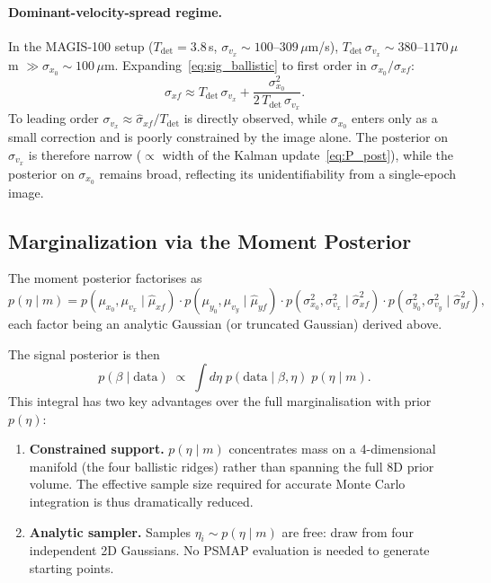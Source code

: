 \documentclass[11pt,a4paper]{article}
\begin{document}
\paragraph{Dominant-velocity-spread regime.}
In the MAGIS-100 setup ($T_\mathrm{det}=3.8$\,s, $\sigma_{v_x}\sim 100$--$309\,\mu$m/s),
$T_\mathrm{det}\,\sigma_{v_x} \sim 380$--$1170\,\mu$m $\gg \sigma_{x_0}\sim 100\,\mu$m.
Expanding~\eqref{eq:sig_ballistic} to first order in $\sigma_{x_0}/\sigma_{xf}$:
\begin{equation}
  \sigma_{xf} \approx T_\mathrm{det}\,\sigma_{v_x}
  + \frac{\sigma^2_{x_0}}{2\,T_\mathrm{det}\,\sigma_{v_x}}.
  \label{eq:sig_expand}
\end{equation}
To leading order $\sigma_{v_x} \approx \hat\sigma_{xf}/T_\mathrm{det}$ is
directly observed, while $\sigma_{x_0}$ enters only as a small correction and
is poorly constrained by the image alone.  The posterior on $\sigma_{v_x}$
is therefore narrow ($\propto$ width of the Kalman update~\eqref{eq:P_post}),
while the posterior on $\sigma_{x_0}$ remains broad, reflecting its
unidentifiability from a single-epoch image.

\subsection{Marginalization via the Moment Posterior}

The moment posterior factorises as
\begin{equation}
  p(\eta \mid m)
  = p(\mu_{x_0},\mu_{v_x} \mid \hat\mu_{xf})
  \cdot p(\mu_{y_0},\mu_{v_y} \mid \hat\mu_{yf})
  \cdot p(\sigma^2_{x_0},\sigma^2_{v_x} \mid \hat\sigma^2_{xf})
  \cdot p(\sigma^2_{y_0},\sigma^2_{v_y} \mid \hat\sigma^2_{yf}),
  \label{eq:factorize}
\end{equation}
each factor being an analytic Gaussian (or truncated Gaussian) derived above.

The signal posterior is then
\begin{equation}
  p(\beta \mid \text{data})
  \;\propto\;
  \int d\eta\;
  p(\text{data} \mid \beta, \eta)\;
  p(\eta \mid m).
  \label{eq:marg_moment}
\end{equation}
This integral has two key advantages over the full marginalisation with
prior $p(\eta)$:

\begin{enumerate}
  \item \textbf{Constrained support.}  $p(\eta \mid m)$ concentrates mass on a
        4-dimensional manifold (the four ballistic ridges) rather than
        spanning the full 8D prior volume.  The effective sample size required
        for accurate Monte Carlo integration is thus dramatically reduced.

  \item \textbf{Analytic sampler.}  Samples $\eta_i \sim p(\eta \mid m)$ are
        free: draw from four independent 2D Gaussians.  No PSMAP evaluation
        is needed to generate starting points.
\end{enumerate}
\end{document}
